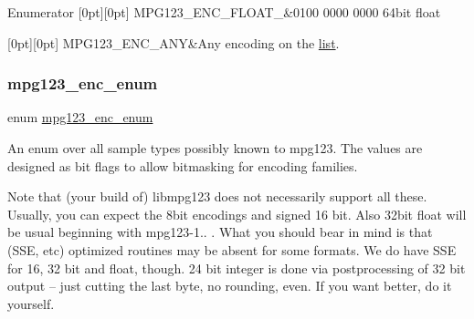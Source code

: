 \begin{DoxyEnumFields}{Enumerator}
[0pt][0pt]{}\mbox{\label{group__mpg123__output_ggafc8cdd60a8d3c30a09249869d835c634a883909122437922b880cedac94035829}} 
M\+P\+G123\+\_\+\+E\+N\+C\+\_\+\+F\+L\+O\+A\+T\+\_&0100 0000 0000 64bit float \\
\hline

[0pt][0pt]{}\mbox{\label{group__mpg123__output_ggafc8cdd60a8d3c30a09249869d835c634a25e4ffefb31c8b40fe30e57790427987}} 
M\+P\+G123\+\_\+\+E\+N\+C\+\_\+\+A\+NY&Any encoding on the \hyperlink{protocollist-p}{list}. \\
\hline

\end{DoxyEnumFields}
\mbox{\label{group__mpg123__output_gafc8cdd60a8d3c30a09249869d835c634}} 
\subsubsection{\texorpdfstring{mpg123\+\_\+enc\+\_\+enum}{mpg123\_enc\_enum}\hspace{0.1cm}{\footnotesize\ttfamily [2/2]}}
{\footnotesize\ttfamily enum \hyperlink{group__mpg123__output_gafc8cdd60a8d3c30a09249869d835c634}{mpg123\+\_\+enc\+\_\+enum}}

An enum over all sample types possibly known to mpg123. The values are designed as bit flags to allow bitmasking for encoding families.

Note that (your build of) libmpg123 does not necessarily support all these. Usually, you can expect the 8bit encodings and signed 16 bit. Also 32bit float will be usual beginning with mpg123-\/1.. . What you should bear in mind is that (S\+SE, etc) optimized routines may be absent for some formats. We do have S\+SE for 16, 32 bit and float, though. 24 bit integer is done via postprocessing of 32 bit output -- just cutting the last byte, no rounding, even. If you want better, do it yourself.

